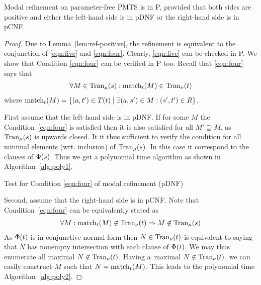 \begin{proposition}
Modal refinement on parameter-free PMTS is in P, provided that 
both sides are positive and 
either the left-hand side is in pDNF or the right-hand side is in pCNF.
\end{proposition}
\begin{proof}
Due to Lemma~\ref{lem:ref-positive}, the refinement is equivalent to the
conjunction of \eqref{eqn:five} and \eqref{eqn:four}. Clearly, \eqref{eqn:five} can be checked in P. 
We show that Condition \eqref{eqn:four} can be verified in P too.
Recall %
that \eqref{eqn:four}  says that
\begin{align*}
 \forall M \in \val_\mu(s) : \match_t(M) \in \val_\nu(t) %
\end{align*}
where $\mathrm{match}_t(M) = \{ (a,t') \in T(t) \mid \exists (a,s') \in M :
(s',t') \in R\}$.

First assume that the left-hand side is in pDNF.
If for some $M$ the Condition~\eqref{eqn:four}  %
is satisfied then it is also
satisfied for all $M' \supseteq M$, as $\mathrm{Tran}_{\mu}(s)$ is upwards closed.
It it thus sufficient to verify the condition 
for all minimal elements (wrt. inclusion)
of $\mathrm{Tran}_{\mu}(s)$. In this case it correspond to the clauses of $\mathrm{\Phi}(s)$.
Thus we get a polynomial time algorithm as shown 
in Algorithm~\ref{alg:poly1}.

\begin{algorithm}[ht]

\;
\caption{Test for Condition \eqref{eqn:four} of modal 
refinement (pDNF) \label{alg:poly1}} 
\end{algorithm}

Second, assume that the right-hand side is in pCNF. 
Note that Condition~\eqref{eqn:four} can be equivalently stated as
\begin{align}
\forall M : \mathrm{match}_t(M) \not\in\mathrm{Tran}_\nu(t) \Rightarrow M \not\in \mathrm{Tran}_\mu(s) \label{eqn:fourEq}
\end{align}
As $\mathrm{\Phi}(t)$ is in conjunctive normal form then 
$N \in \mathrm{Tran}_\nu(t)$ is equivalent to saying that
$N$ has nonempty
intersection with each clause of $\mathrm{\Phi}(t)$. 
We may thus enumerate all maximal $N \not\in \mathrm{Tran}_\nu(t)$.
Having a~maximal $N \not\in \mathrm{Tran}_\nu(t)$, we 
can easily construct $M$ such that $N = \mathrm{match}_t(M)$.
This leads to the polynomial time Algorithm~\ref{alg:poly2}.


\end{proof}

